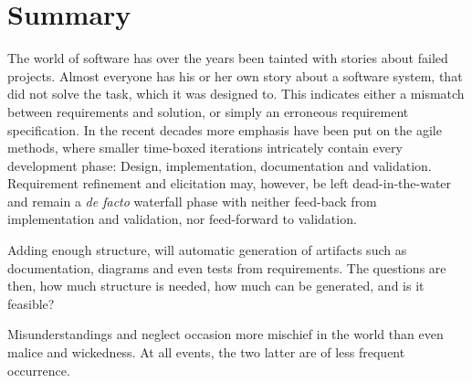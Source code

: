 \chapter{Summary}
The world of software has over the years been tainted with stories about failed projects. Almost everyone has his or her own story about a software system, that did not solve the task, which it was designed to. This indicates either a mismatch between requirements and solution, or simply an erroneous requirement specification. In the recent decades more emphasis have been put on the agile methods, where smaller time-boxed iterations intricately contain every development phase: Design, implementation, documentation and validation. Requirement refinement and elicitation may, however, be left dead-in-the-water and remain a \emph{de facto} waterfall phase with neither feed-back from implementation and validation, nor feed-forward to validation.\bigskip

\noindent Adding enough structure, will automatic generation of artifacts such as documentation, diagrams and even tests from requirements. The questions are then, how much structure is needed, how much can be generated, and is it feasible?

\newpage
\begin{fquote}Misunderstandings and neglect occasion more mischief in the world than even malice and wickedness. At all events, the two latter are of less frequent occurrence.
\end{fquote}